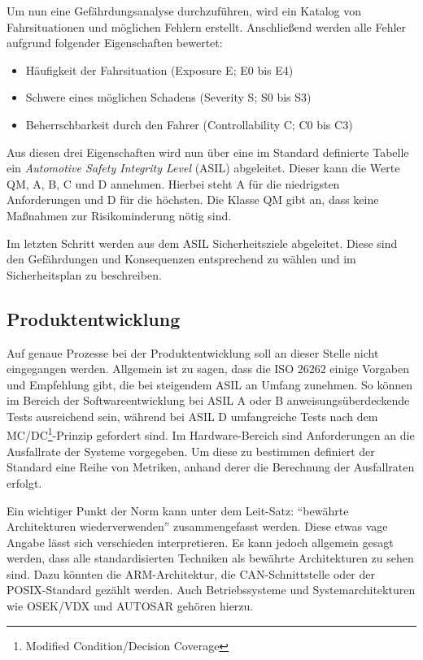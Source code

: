 \documentclass[
  a4paper,					    %
  twoside,
  DIV=calc,     				%
  bibliography=totoc,
  cleardoublepage=empty,
  ngerman,     					%
  final       					%
]{scrbook}
\begin{document}
Um nun eine Gefährdungsanalyse durchzuführen, wird ein Katalog von Fahrsituationen und möglichen Fehlern erstellt. Anschließend werden alle Fehler aufgrund folgender Eigenschaften bewertet:

\begin{itemize}
    \item Häufigkeit der Fahrsituation (Exposure E; E0 bis E4)
    \item Schwere eines möglichen Schadens (Severity S; S0 bis S3)
    \item Beherrschbarkeit durch den Fahrer (Controllability C; C0 bis C3)
\end{itemize}

Aus diesen drei Eigenschaften wird nun über eine im Standard definierte Tabelle ein \emph{Automotive Safety Integrity Level} (ASIL) abgeleitet. Dieser kann die Werte QM, A, B, C und D annehmen. Hierbei steht A für die niedrigsten Anforderungen und D für die höchsten. Die Klasse QM gibt an, dass keine Maßnahmen zur Risikominderung nötig sind.

Im letzten Schritt werden aus dem ASIL Sicherheitsziele abgeleitet. Diese sind den Gefährdungen und Konsequenzen entsprechend zu wählen und im Sicherheitsplan zu beschreiben.


\subsection{Produktentwicklung}
\label{sec:ISO26262_produkt_entwicklung}
Auf genaue Prozesse bei der Produktentwicklung soll an dieser Stelle nicht eingegangen werden. Allgemein ist zu sagen, dass die ISO 26262 einige Vorgaben und Empfehlung gibt, die bei steigendem ASIL an Umfang zunehmen. So können im Bereich der Softwareentwicklung bei ASIL A oder B anweisungsüberdeckende Tests ausreichend sein, während bei ASIL D umfangreiche Tests nach dem MC/DC\footnote{Modified Condition/Decision Coverage}-Prinzip gefordert sind. Im Hardware-Bereich sind Anforderungen an die Ausfallrate der Systeme vorgegeben. Um diese zu bestimmen definiert der Standard eine Reihe von Metriken, anhand derer die Berechnung der Ausfallraten erfolgt.

Ein wichtiger Punkt der Norm kann unter dem Leit-Satz: "`bewährte Architekturen wiederverwenden"' zusammengefasst werden. Diese etwas vage Angabe lässt sich verschieden interpretieren. Es kann jedoch allgemein gesagt werden, dass alle standardisierten Techniken als bewährte Architekturen zu sehen sind. Dazu könnten die ARM-Architektur, die CAN-Schnittstelle oder der POSIX-Standard gezählt werden. Auch Betriebssysteme und Systemarchitekturen wie OSEK/VDX und AUTOSAR gehören hierzu.
\end{document}
